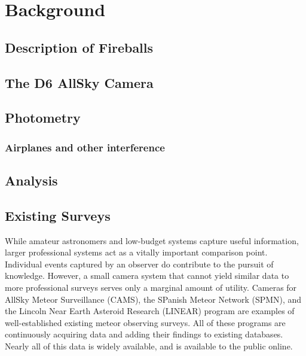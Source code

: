 \chapter{Background}

\section{Description of Fireballs}













\section{The D6 AllSky Camera}













\section{Photometry}





\subsection{Airplanes and other interference}







\section{Analysis}













\section{Existing Surveys}
While amateur astronomers and low-budget systems capture useful information, larger professional systems act as a vitally important comparison point.
Individual events captured by an observer do contribute to the pursuit of knowledge.
However, a small camera system that cannot yield similar data to more professional surveys serves only a marginal amount of utility.
Cameras for AllSky Meteor Surveillance (CAMS), the SPanish Meteor Network (SPMN), and the Lincoln Near Earth Asteroid Research (LINEAR) program are examples of well-established existing meteor observing surveys.  
All of these programs are continuously acquiring data and adding their findings to existing databases.  
Nearly all of this data is widely available, and is available to the public online. 



